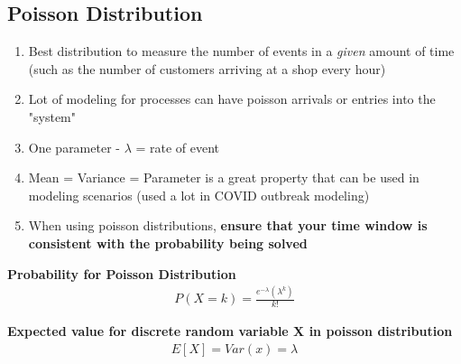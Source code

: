 \documentclass[../INDE315.tex]{subfiles}
\begin{document}
\subsection*{Poisson Distribution}
\begin{enumerate}
    \item Best distribution to measure the number of events in a \emph{given} amount of time (such as the number of customers arriving at a shop every hour)
    \item Lot of modeling for processes can have poisson arrivals or entries into the "system"
    \item One parameter - $\lambda$ = rate of event
    \item Mean = Variance = Parameter is a great property that can be used in modeling scenarios (used a lot in COVID outbreak modeling)
    \item When using poisson distributions, \textbf{ensure that your time window is consistent with the probability being solved}
\end{enumerate}
\begin{defn}
    \textbf{Probability for Poisson Distribution} \\  
    \begin{equation*}
        \begin{aligned}
            P(X = k) = \frac{e^{-\lambda}(\lambda ^k)}{k!}
        \end{aligned}
    \end{equation*}
\end{defn}

\begin{defn}
    \textbf{Expected value for discrete random variable X in poisson distribution} \\
    \begin{equation*}
        \begin{aligned}
            E[X] = Var(x) = \lambda 
        \end{aligned}
    \end{equation*}
    
\end{defn}
\end{document}
